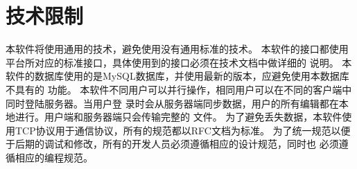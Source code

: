 \section{技术限制}
本软件将使用通用的技术，避免使用没有通用标准的技术。
本软件的接口都使用平台所对应的标准接口，具体使用到的接口必须在技术文档中做详细的 说明。
本软件的数据库使用的是MySQL数据库，并使用最新的版本，应避免使用本数据库不具有的 功能。
本软件不同用户可以并行操作，相同用户可以在不同的客户端中同时登陆服务器。当用户登 录时会从服务器端同步数据，用户的所有编辑都在本地进行。用户端和服务器端只会传输完整的 文件。
为了避免丢失数据，本软件使用TCP协议用于通信协议，所有的规范都以RFC文档为标准。
为了统一规范以便于后期的调试和修改，所有的开发人员必须遵循相应的设计规范，同时也 必须遵循相应的编程规范。
